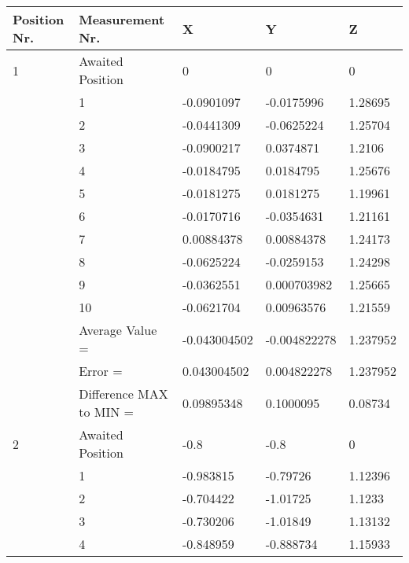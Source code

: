 \begin{tabular}{|p{2cm}|p{3cm}|p{3cm}|p{3cm}|p{3cm}|}
\hline
Position Nr. & Measurement Nr.         & X            & Y            & Z          \\
\hline
1            & Awaited Position        & 0            & 0            & 0          \\
             & 1                       & -0.0901097   & -0.0175996   & 1.28695    \\
             & 2                       & -0.0441309   & -0.0625224   & 1.25704    \\
             & 3                       & -0.0900217   & 0.0374871    & 1.2106     \\
             & 4                       & -0.0184795   & 0.0184795    & 1.25676    \\
             & 5                       & -0.0181275   & 0.0181275    & 1.19961    \\
             & 6                       & -0.0170716   & -0.0354631   & 1.21161    \\
             & 7                       & 0.00884378   & 0.00884378   & 1.24173    \\
             & 8                       & -0.0625224   & -0.0259153   & 1.24298    \\
             & 9                       & -0.0362551   & 0.000703982  & 1.25665    \\
             & 10                      & -0.0621704   & 0.00963576   & 1.21559    \\
             & Average Value =         & -0.043004502 & -0.004822278 & 1.237952   \\
             & Error =                 & 0.043004502  & 0.004822278  & 1.237952   \\
             & Difference MAX to MIN = & 0.09895348   & 0.1000095    & 0.08734    \\
\hline
 2            & Awaited Position        & -0.8         & -0.8         & 0          \\
             & 1                       & -0.983815    & -0.79726     & 1.12396    \\
             & 2                       & -0.704422    & -1.01725     & 1.1233     \\
             & 3                       & -0.730206    & -1.01849     & 1.13132    \\
             & 4                       & -0.848959    & -0.888734    & 1.15933    \\

\end{tabular}
